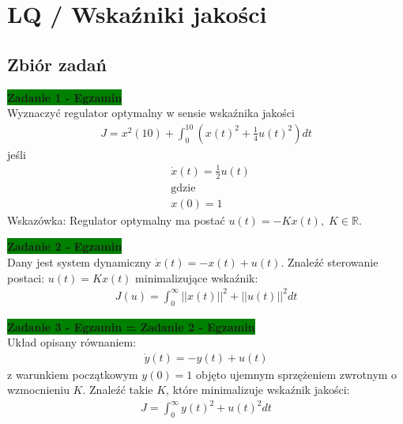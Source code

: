 \documentclass[a4paper,11pt]{article}
\begin{document}
\newpage
\section{LQ / Wskaźniki jakości}
\subsection{Zbiór zadań}
\begin{framed}
\textbf{\colorbox{green}{Zadanie 1 - Egzamin }} \\ 
Wyznaczyć regulator optymalny w sensie wskaźnika jakości 
\begin{align*}
J = x^2(10) + \int_0^{10}( x(t)^{2}+\frac{1}{4}u(t)^{2}) dt
\end{align*}
jeśli
\begin{align*}
&\dot{x}(t)=\frac{1}{2}u(t) \\
&\text{gdzie} \\
&x(0)= 1 
\end{align*}
Wskazówka: Regulator optymalny ma postać \( u(t) = -Kx(t), \; K \in \mathbb{R} \). 
\end{framed}

\begin{framed}
\textbf{\colorbox{green}{Zadanie 2 - Egzamin }} \\ 
Dany jest system dynamiczny \( \dot{x}(t)=-x(t)+u(t) \). Znaleźć sterowanie postaci: \( u(t)=Kx(t) \) minimalizujące wskaźnik:
\begin{align*}
J(u)= \int _0^{\infty} ||x(t)||^2+||u(t)||^2 dt
\end{align*}
\end{framed}

\begin{framed}
\textbf{\colorbox{green}{Zadanie 3 - Egzamin = Zadanie 2 - Egzamin}} \\ 
Układ opisany równaniem:
\begin{align*}
\dot{y}(t)=-y(t)+u(t)
\end{align*}
z warunkiem początkowym \( y(0)=1 \) objęto ujemnym sprzężeniem zwrotnym o wzmocnieniu \(K\). Znaleźć takie \(K\), które minimalizuje wskaźnik jakości:
\begin{align*}
J = \int _0^{\infty} y(t)^{2} + u(t)^{2} dt
\end{align*} 
\end{framed}

\newpage
\end{document}
